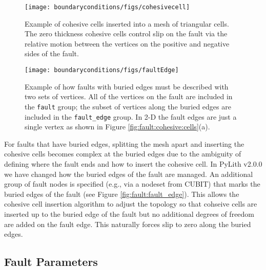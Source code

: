 \begin{figure}[htbp]
  \texttt{[image: boundaryconditions/figs/cohesivecell]}
  \caption{Example of cohesive cells inserted into a mesh of
    triangular cells.  The zero thickness cohesive cells control slip
    on the fault via the relative motion between the vertices on the
    positive and negative sides of the fault.}
  \label{fig:fault:cohesive:cells} 
\end{figure}

\begin{figure}[htbp]
  \texttt{[image: boundaryconditions/figs/faultEdge]}
  \caption{Example of how faults with buried edges must be described
    with two sets of vertices. All of the vertices on the fault are
    included in the \texttt{fault} group; the subset of vertices along
    the buried edges are included in the \texttt{fault\_edge}
    group. In 2-D the fault edges are just a single vertex as shown in
    Figure
    \vref{fig:fault:cohesive:cells}(a).}
  \label{fig:fault:fault_edge}
\end{figure}
For faults that have buried edges, splitting the mesh apart and inserting
the cohesive cells becomes complex at the buried edges due to the
ambiguity of defining where the fault ends and how to insert the cohesive
cell. In PyLith v2.0.0 we have changed how the buried edges of the
fault are managed. An additional group of fault nodes is specified
(e.g., via a nodeset from CUBIT) that marks the buried edges of the
fault (see Figure \vref{fig:fault:fault_edge}). This allows the cohesive
cell insertion algorithm to adjust the topology so that cohseive cells
are inserted up to the buried edge of the fault but no additional
degrees of freedom are added on the fault edge. This naturally forces
slip to zero along the buried edges.

\subsection{Fault Parameters}


